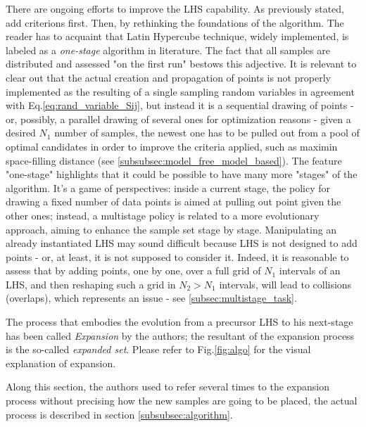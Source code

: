\documentclass[12pt]{extarticle}
\newcommand{\meqref}[1]{Eq.\ref{#1}}
\newcommand{\mfigref}[1]{Fig.\ref{#1}}
\begin{document}
There are ongoing efforts to improve the LHS capability. As previously stated, add criterions first. Then, by rethinking the foundations of the algorithm. The reader has to acquaint that Latin Hypercube technique, widely implemented, is labeled as a \textit{one-stage} algorithm in literature. The fact that all samples are distributed and assessed "on the first run" bestows this adjective. It is relevant to clear out that the actual creation and propagation of points is not properly implemented as the resulting of a single sampling random variables in agreement with \meqref{eq:rand_variable_Sij}, but instead it is a sequential drawing of points - or, possibly, a parallel drawing of several ones for optimization reasons - given a desired $N_1$ number of samples, the newest one has to be pulled out from a pool of optimal candidates in order to improve the criteria applied, such as maximin space-filling distance (see \cref{subsubsec:model_free_model_based}). The feature "one-stage" highlights that it could be possible to have many more "stages" of the algorithm. It's a game of perspectives: inside a current stage, the policy for drawing a fixed number of data points is aimed at pulling out point given the other ones; instead, a multistage policy is related to a more evolutionary approach, aiming to enhance the sample set stage by stage. Manipulating an already instantiated LHS may sound difficult because LHS is not designed to add points - or, at least, it is not supposed to consider it. Indeed, it is reasonable to assess that by adding points, one by one, over a full grid of $N_1$ intervals of an LHS, and then reshaping such a grid in $N_2 > N_1$ intervals, will lead to collisions (overlaps), which represents an issue - see \cref{subsec:multistage_task}.

The process that embodies the evolution from a precursor LHS to his next-stage has been called \textit{Expansion} by the authors; the resultant of the expansion process is the so-called \textit{expanded set}. Please refer to \mfigref{fig:algo} for the visual explanation of expansion.

Along this section, the authors used to refer several times to the expansion process without precising how the new samples are going to be placed, the actual process is described in section \cref{subsubsec:algorithm}.
\end{document}
